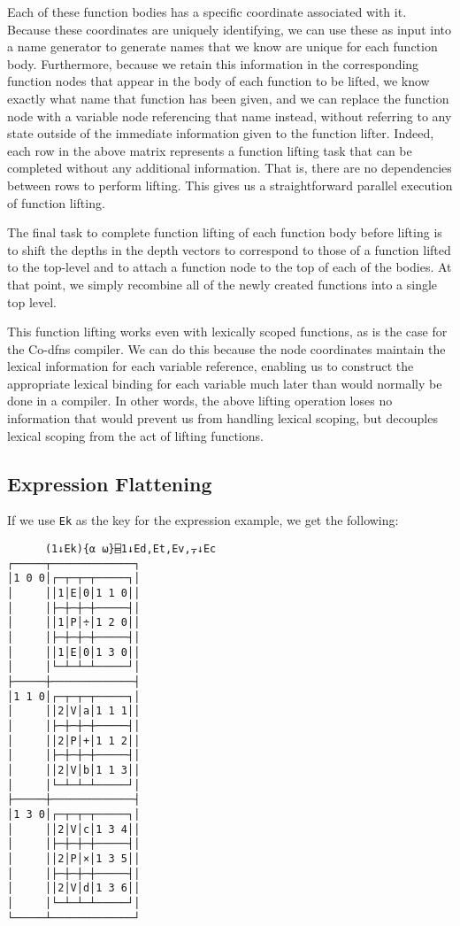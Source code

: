 \documentclass[numbers,preprint]{sigplanconf}
\begin{document}
Each of these function bodies has a specific coordinate associated
with it. Because these coordinates are uniquely identifying, we can
use these as input into a name generator to generate names that we
know are unique for each function body. Furthermore, because we
retain this information in the corresponding function nodes that
appear in the body of each function to be lifted, we know exactly
what name that function has been given, and we can replace the
function node with a variable node referencing that name instead,
without referring to any state outside of the immediate information
given to the function lifter. Indeed, each row in the above matrix
represents a function lifting task that can be completed without any
additional information. That is, there are no dependencies between
rows to perform lifting. This gives us a straightforward parallel
execution of function lifting.

The final task to complete function lifting of each function
body before lifting is to shift the depths in the depth vectors
to correspond to those of a function lifted to the top-level and
to attach a function node to the top of each of the bodies. At that
point, we simply recombine all of the newly created functions into
a single top level.

This function lifting works even with lexically scoped functions, 
as is the case for the Co-dfns compiler.
We can do this because the node coordinates maintain the lexical information 
for each variable reference, enabling us to construct the appropriate lexical 
binding for each variable much later than would normally be done in a 
compiler. 
In other words, the above lifting operation loses no information that would 
prevent us from handling lexical scoping, but decouples lexical scoping 
from the act of lifting functions.

\subsection{Expression Flattening}

If we use \verb;Ek; as the key for the expression example, we get the
following:

\begin{verbatim}
      (1↓Ek){⍺ ⍵}⌸1↓Ed,Et,Ev,⍪↓Ec
┌─────┬─────────────┐
│1 0 0│┌─┬─┬─┬─────┐│
│     ││1│E│0│1 1 0││
│     │├─┼─┼─┼─────┤│
│     ││1│P│÷│1 2 0││
│     │├─┼─┼─┼─────┤│
│     ││1│E│0│1 3 0││
│     │└─┴─┴─┴─────┘│
├─────┼─────────────┤
│1 1 0│┌─┬─┬─┬─────┐│
│     ││2│V│a│1 1 1││
│     │├─┼─┼─┼─────┤│
│     ││2│P│+│1 1 2││
│     │├─┼─┼─┼─────┤│
│     ││2│V│b│1 1 3││
│     │└─┴─┴─┴─────┘│
├─────┼─────────────┤
│1 3 0│┌─┬─┬─┬─────┐│
│     ││2│V│c│1 3 4││
│     │├─┼─┼─┼─────┤│
│     ││2│P│×│1 3 5││
│     │├─┼─┼─┼─────┤│
│     ││2│V│d│1 3 6││
│     │└─┴─┴─┴─────┘│
└─────┴─────────────┘
\end{verbatim}
\end{document}
